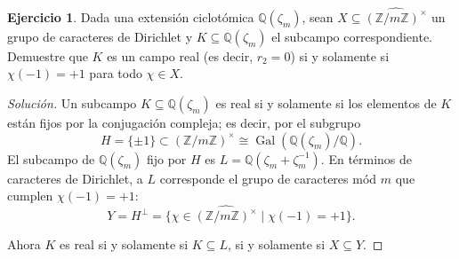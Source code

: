\documentclass{article}
\theoremstyle{definition}
\newtheorem{ejercicio}{Ejercicio}
\newenvironment{solucion}{\begin{proof}[Solución]}{\end{proof}}
\DeclareMathOperator{\Gal}{Gal}
\newcommand{\ZZ}{\mathbb{Z}}
\newcommand{\QQ}{\mathbb{Q}}
\begin{document}
\begin{ejercicio}
  Dada una extensión ciclotómica $\QQ (\zeta_m)$, sean
  $X \subseteq \widehat{(\ZZ/m\ZZ)^\times}$ un grupo de caracteres de Dirichlet
  y $K \subseteq \QQ (\zeta_m)$ el subcampo correspondiente. Demuestre que $K$
  es un campo real (es decir, $r_2 = 0$) si y solamente si $\chi (-1) = +1$ para
  todo $\chi \in X$.

  \ifdefined\solutions
  \begin{solucion}
    Un subcampo $K \subseteq \QQ (\zeta_m)$ es real si y solamente si los
    elementos de $K$ están fijos por la conjugación compleja; es decir, por el
    subgrupo
    $$H = \{ \pm 1 \} \subset (\ZZ/m\ZZ)^\times \cong \Gal (\QQ (\zeta_m)/\QQ).$$
    El subcampo de $\QQ (\zeta_m)$ fijo por $H$ es
    $L = \QQ (\zeta_m + \zeta_m^{-1})$. En términos de caracteres de Dirichlet,
    a $L$ corresponde el grupo de caracteres mód $m$ que cumplen $\chi (-1) = +1$:
    $$Y = H^\perp = \{ \chi \in \widehat{(\ZZ/m\ZZ)^\times} \mid \chi (-1) = +1 \}.$$

    Ahora $K$ es real si y solamente si $K \subseteq L$, si y solamente si
    $X \subseteq Y$.
  \end{solucion}
  \fi
\end{ejercicio}
\end{document}
